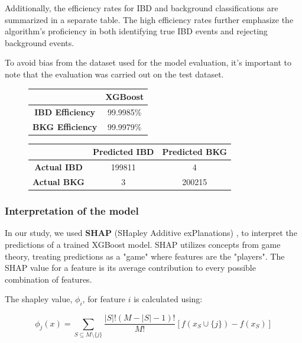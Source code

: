 Additionally, the efficiency rates for IBD and background classifications are summarized in a separate table. The high efficiency rates further emphasize the algorithm's proficiency in both identifying true IBD events and rejecting background events.

To avoid bias from the dataset used for the model evaluation, it's important to note that the evaluation was carried out on the test dataset.

\begin{figure}[h!]
	\centering
	\begin{minipage}{0.33\textwidth}
	\centering
	\begin{tabular}{cc}
		\toprule
		& \textbf{XGBoost} \\
		\midrule
		\textbf{IBD Efficiency} & 99.9985\% \\
		\textbf{BKG Efficiency} & 99.9979\% \\
		\bottomrule
	\end{tabular}
	\end{minipage}
	\begin{minipage}{0.65\textwidth}
	\centering
	\begin{tabular}{ccc}
		\toprule
		& \textbf{Predicted IBD} & \textbf{Predicted BKG} \\
		\midrule
		\textbf{Actual IBD} & 199811 & 4 \\
		\textbf{Actual BKG} & 3 & 200215 \\
		\bottomrule
	\end{tabular}
	\label{tab:conf_matrix_xgb}
\end{minipage}
\end{figure}




\subsubsection{Interpretation of the model}
In our study, we used \textbf{SHAP} (SHapley Additive exPlanations)  \cite{shap}, to interpret the predictions of a trained XGBoost model. SHAP utilizes concepts from game theory, treating predictions as a "game" where features are the "players". The SHAP value for a feature is its average contribution to every possible combination of features.

The shapley value, \(\phi_i\), for feature \(i\) is calculated using:

\begin{equation}
	\phi_j(x) = \sum_{S \subseteq M\setminus\{j\}} \frac{|S|!(M-|S|-1)!}{M!} [f(x_S \cup \{j\}) - f(x_S)]
\end{equation}

